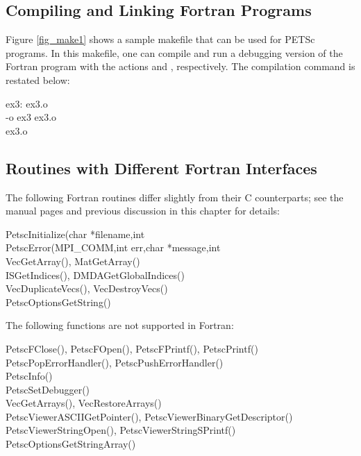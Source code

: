 \subsection{Compiling and Linking Fortran Programs}
\label{sec_fortcompile}

Figure \ref{fig_make1} shows a sample makefile that can be used for
PETSc programs.  In this makefile, one can compile and run a debugging version
of the Fortran program  with the actions    and
 , respectively. The compilation command is restated below:
\begin{tabbing}
   ex3: ex3.o \\
    -o ex3 ex3.o \\
    ex3.o
\end{tabbing}

\subsection{Routines with Different Fortran Interfaces}
\label{sec_fortran_exceptions}

The following Fortran routines differ slightly from their C counterparts; see the 
manual pages and previous discussion in this chapter for details:
\begin{tabbing}
 PetscInitialize(char *filename,int \\
 PetscError(MPI\_COMM,int err,char *message,int \\
 VecGetArray(), MatGetArray()\\
 ISGetIndices(), DMDAGetGlobalIndices()\\
 VecDuplicateVecs(), VecDestroyVecs()\\
 PetscOptionsGetString()
\end{tabbing}
The following functions are not supported in Fortran:
\begin{tabbing}
 PetscFClose(), PetscFOpen(), PetscFPrintf(), PetscPrintf()\\
 PetscPopErrorHandler(), PetscPushErrorHandler()\\
 PetscInfo()\\
 PetscSetDebugger()\\
 VecGetArrays(), VecRestoreArrays()\\
 PetscViewerASCIIGetPointer(), PetscViewerBinaryGetDescriptor()\\
 PetscViewerStringOpen(), PetscViewerStringSPrintf()\\
 PetscOptionsGetStringArray()
\end{tabbing}

